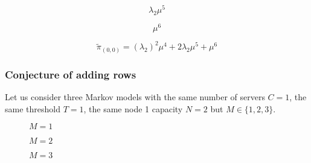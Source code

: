 \newpage

\begin{multicols}{4}
    \begin{figure}[H]
        \centering
        \scalebox{0.48}{
            }
    \end{figure}
    \vspace*{\fill}
    \columnbreak
    \begin{equation*}
        \lambda_2 \mu^5
    \end{equation*}
    \vspace*{\fill}
    \columnbreak
    \begin{figure}[H]
        \centering
        \scalebox{0.48}{
            }
    \end{figure}
    \vspace*{\fill}
    \columnbreak
    \begin{equation*}
        \mu^6
    \end{equation*}
\end{multicols}


\begin{equation*}
    \tilde{\pi}_{(0,0)} = (\lambda_2)^2 \mu^4 + 2 \lambda_2 \mu^5 + \mu^6
\end{equation*}

\subsubsection{Conjecture of adding rows}

Let us consider three Markov models with the same number of servers \(C=1\),
the same threshold \(T=1\), the same node 1 capacity \(N=2\) but
\(M\in\{1, 2, 3\}\).


\begin{multicols}{3}
    \begin{figure}[H]
        \centering
        \scalebox{0.65}{
            }
        \caption{\(M=1\)}
    \end{figure}
    \columnbreak
    \begin{figure}[H]
        \centering
        \scalebox{0.65}{
            }
        \caption{\(M=2\)}
    \end{figure}
    \begin{figure}[H]
        \centering
        \scalebox{0.65}{
            }
        \caption{\(M=3\)}
    \end{figure}
\end{multicols}

